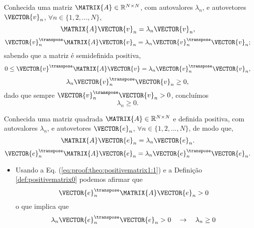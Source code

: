 \begin{myproofT}\label{proof:theo:semipositivematrix2}
Conhecida uma matriz $\MATRIX{A} \in \mathbb{R}^{N \times N}$, com  autovalores $\lambda_n$,
e autovetores $\VECTOR{v}_n$, $\forall n \in \{1, 2, ..., N\}$,
\begin{equation}
\MATRIX{A}\VECTOR{v}_n = \lambda_n \VECTOR{v}_n, 
\end{equation}
\begin{equation}
\VECTOR{v}_n^{\transpose}\MATRIX{A}\VECTOR{v}_n = \lambda_n \VECTOR{v}_n^{\transpose}\VECTOR{v}_n;
\end{equation}
sabendo que a matriz é semidefinida positiva,
\begin{equation}
0 \leq \VECTOR{v}^{\transpose}\MATRIX{A}\VECTOR{v} = \lambda_n \VECTOR{v}_n^{\transpose}\VECTOR{v}_n,
\end{equation}
\begin{equation}
\lambda_n \VECTOR{v}_n^{\transpose}\VECTOR{v}_n \geq 0,
\end{equation}
dado que sempre $\VECTOR{v}_n^{\transpose}\VECTOR{v}_n> 0$, concluímos
\begin{equation}
\lambda_n  \geq 0.
\end{equation} 
\end{myproofT}

\begin{myproofT}\label{proof:theo:positivematrix1}
Conhecida uma matriz quadrada $\MATRIX{A} \in \mathbb{R}^{N \times N}$ e definida positiva, com  autovalores $\lambda_n$,
e autovetores $\VECTOR{e}_n$, $\forall n \in \{1, 2, ..., N\}$, de modo que,
\begin{equation}\label{eq:proof:theo:positivematrix1:0}
\MATRIX{A}\VECTOR{e}_n=\lambda_n \VECTOR{e}_n.
\end{equation}
\begin{equation}\label{eq:proof:theo:positivematrix1:1}
\VECTOR{e}_n^{\transpose}\MATRIX{A}\VECTOR{e}_n=\lambda_n \VECTOR{e}_n^{\transpose}\VECTOR{e}_n.
\end{equation}

\begin{itemize}
\item Usando a Eq. (\ref{eq:proof:theo:positivematrix1:1}) e a Definição \ref{def:positivematrix0} podemos afirmar que
\begin{equation}
\VECTOR{e}_n^{\transpose}\MATRIX{A}\VECTOR{e}_n >0
\end{equation} 
o que implica que
\begin{equation}
\lambda_n \VECTOR{e}_n^{\transpose}\VECTOR{e}_n > 0
\quad \rightarrow \quad
\lambda_n  \geq 0
\end{equation} 
\end{itemize}
\end{myproofT}



